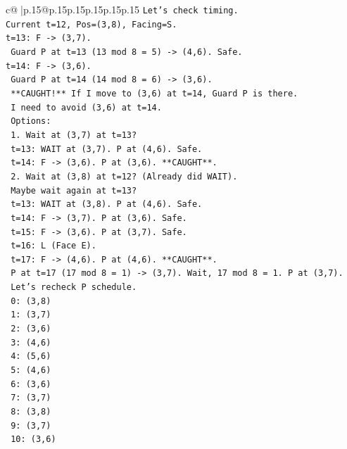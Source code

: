 \documentclass{article}
\begin{document}
{\begin{supertabular}{c@{$\;$}|p{.15\linewidth}@{}p{.15\linewidth}p{.15\linewidth}p{.15\linewidth}p{.15\linewidth}p{.15\linewidth}}
{{{\texttt{Let's check timing.} \\
\texttt{Current t=12, Pos=(3,8), Facing=S.} \\
\texttt{t=13: F {-}> (3,7).} \\
\texttt{  Guard P at t=13 (13 mod 8 = 5) {-}> (4,6). Safe.} \\
\texttt{t=14: F {-}> (3,6).} \\
\texttt{  Guard P at t=14 (14 mod 8 = 6) {-}> (3,6).} \\
\texttt{  **CAUGHT!** If I move to (3,6) at t=14, Guard P is there.} \\
\texttt{  I need to avoid (3,6) at t=14.} \\
\texttt{  Options:} \\
\texttt{  1. Wait at (3,7) at t=13?} \\
\texttt{     t=13: WAIT at (3,7). P at (4,6). Safe.} \\
\texttt{     t=14: F {-}> (3,6). P at (3,6). **CAUGHT**.} \\
\texttt{  2. Wait at (3,8) at t=12? (Already did WAIT).} \\
\texttt{     Maybe wait again at t=13?} \\
\texttt{     t=13: WAIT at (3,8). P at (4,6). Safe.} \\
\texttt{     t=14: F {-}> (3,7). P at (3,6). Safe.} \\
\texttt{     t=15: F {-}> (3,6). P at (3,7). Safe.} \\
\texttt{     t=16: L (Face E).} \\
\texttt{     t=17: F {-}> (4,6). P at (4,6). **CAUGHT**.} \\
\texttt{     P at t=17 (17 mod 8 = 1) {-}> (3,7). Wait, 17 mod 8 = 1. P at (3,7).} \\
\texttt{     Let's recheck P schedule.} \\
\texttt{     0: (3,8)} \\
\texttt{     1: (3,7)} \\
\texttt{     2: (3,6)} \\
\texttt{     3: (4,6)} \\
\texttt{     4: (5,6)} \\
\texttt{     5: (4,6)} \\
\texttt{     6: (3,6)} \\
\texttt{     7: (3,7)} \\
\texttt{     8: (3,8)} \\
\texttt{     9: (3,7)} \\
\texttt{     10: (3,6)} \\
}}}
\end{supertabular}}
\end{document}
